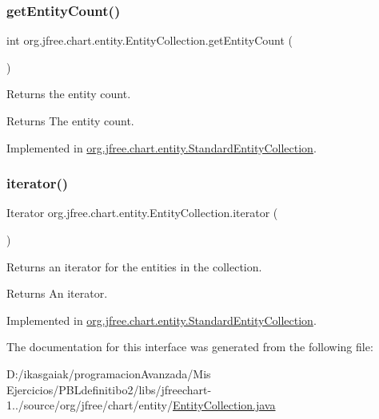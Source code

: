 \subsubsection{\texorpdfstring{get\+Entity\+Count()}{getEntityCount()}}
{\footnotesize\ttfamily int org.\+jfree.\+chart.\+entity.\+Entity\+Collection.\+get\+Entity\+Count (\begin{DoxyParamCaption}{ }\end{DoxyParamCaption})}

Returns the entity count.

\begin{DoxyReturn}{Returns}
The entity count. 
\end{DoxyReturn}


Implemented in \mbox{\hyperlink{classorg_1_1jfree_1_1chart_1_1entity_1_1_standard_entity_collection_addd9f5935fb56802f93fd4ee2964b573}{org.\+jfree.\+chart.\+entity.\+Standard\+Entity\+Collection}}.

\mbox{\label{interfaceorg_1_1jfree_1_1chart_1_1entity_1_1_entity_collection_a69ebb556987750e02a98f978e26fa4e7}} 
\subsubsection{\texorpdfstring{iterator()}{iterator()}}
{\footnotesize\ttfamily Iterator org.\+jfree.\+chart.\+entity.\+Entity\+Collection.\+iterator (\begin{DoxyParamCaption}{ }\end{DoxyParamCaption})}

Returns an iterator for the entities in the collection.

\begin{DoxyReturn}{Returns}
An iterator. 
\end{DoxyReturn}


Implemented in \mbox{\hyperlink{classorg_1_1jfree_1_1chart_1_1entity_1_1_standard_entity_collection_add3c9d1d34e8cfa4225356a2a01e9248}{org.\+jfree.\+chart.\+entity.\+Standard\+Entity\+Collection}}.



The documentation for this interface was generated from the following file\+:\begin{DoxyCompactItemize}
\item 
D\+:/ikasgaiak/programacion\+Avanzada/\+Mis Ejercicios/\+P\+B\+Ldefinitibo2/libs/jfreechart-\/1../source/org/jfree/chart/entity/\mbox{\hyperlink{_entity_collection_8java}{Entity\+Collection.\+java}}\end{DoxyCompactItemize}
